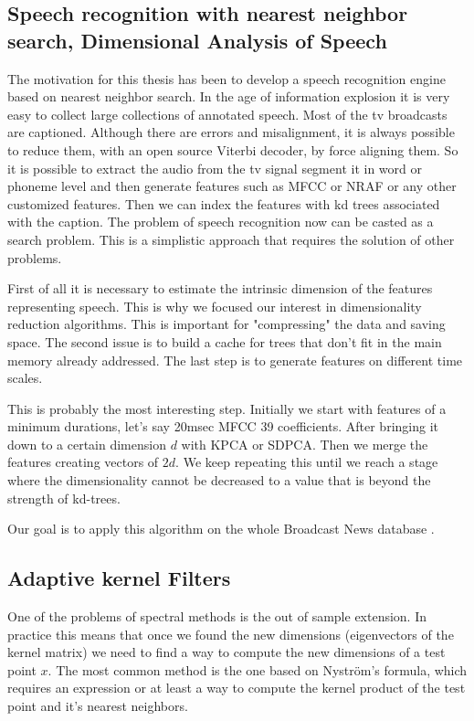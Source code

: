 \documentclass[12pt,letterpaper,doublespaced,ETD,dvips,proposal]{gtthesis}
\begin{document}
\begin{Body}
\subsection{Speech recognition with nearest neighbor search, Dimensional Analysis of Speech}
The  motivation for this thesis has been to develop a speech recognition engine based on nearest neighbor search. In the age of information explosion it is very easy to collect large collections of annotated speech. Most of the tv broadcasts are captioned. Although there are errors and misalignment, it is always possible to reduce them, with an open source Viterbi decoder, by force aligning them. So it is possible to extract the audio from the tv signal segment it in word or phoneme level and then generate features such as MFCC or NRAF or any other customized features. Then we can index the features with kd trees associated with the caption. The problem of speech recognition now can be casted as a search problem. This is a simplistic approach that requires the solution of other problems.

First of all it is necessary to estimate the intrinsic dimension of the features representing speech. This is why we focused our interest in dimensionality reduction algorithms. This is important for "compressing" the data and saving space. The second issue is to build a cache for trees that don't fit in the main memory already addressed. The last step is to generate features on different time scales.

This is probably the most interesting step. Initially we start with features of a minimum durations, let's say 20msec MFCC 39 coefficients. After bringing it down to a certain dimension $d$ with KPCA or SDPCA. Then we merge the features creating vectors of $2d$. We keep repeating this until we reach a stage where the dimensionality cannot be decreased to a value that is beyond the strength of kd-trees.

Our goal is to apply this algorithm on the whole Broadcast News database \cite{graff1997bns}.

\subsection{Adaptive kernel Filters}
One of the problems of spectral methods is the out of sample
extension. In practice this means that once we found the new
dimensions (eigenvectors of the kernel matrix) we need to find a way
to compute the new dimensions of a test point $x$. The most common
method is the one based on Nystr\"{o}m's formula, which requires an
expression or at least a way to compute the kernel product of the
test point and it's nearest neighbors.


\end{Body}
\end{document}

